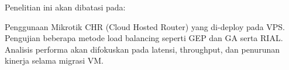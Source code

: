 Penelitian ini akan dibatasi pada:

    Penggunaan Mikrotik CHR (Cloud Hosted Router) yang di-deploy pada VPS.
    Pengujian beberapa metode load balancing seperti GEP dan GA serta RIAL.
    Analisis performa akan difokuskan pada latensi, throughput, dan penurunan kinerja selama migrasi VM.
